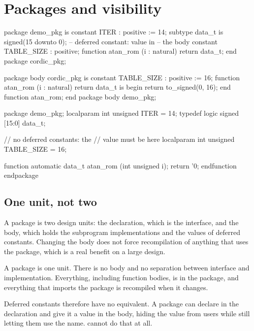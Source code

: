 \section{Packages and visibility}
\label{sec:rosetta:packages}

\begin{rosetta}
\begin{rleft}
package demo_pkg is
  constant ITER : positive := 14;
  subtype data_t is
    signed(15 downto 0);
  -- deferred constant: value in
  -- the body
  constant TABLE_SIZE : positive;
  function atan_rom (i : natural)
    return data_t;
end package cordic_pkg;

package body cordic_pkg is
  constant TABLE_SIZE : positive := 16;
  function atan_rom (i : natural)
    return data_t is
  begin
    return to_signed(0, 16);
  end function atan_rom;
end package body demo_pkg;
\end{rleft}
\begin{rright}
package demo_pkg;
  localparam int unsigned ITER = 14;
  typedef logic signed [15:0] data_t;

  // no deferred constants: the
  // value must be here
  localparam int unsigned
    TABLE_SIZE = 16;

  function automatic data_t
      atan_rom (int unsigned i);
    return '0;
  endfunction
endpackage
\end{rright}
\end{rosetta}


\subsection{One unit, not two}

A \VHDL{} package is two design units: the declaration, which is the interface,
and the body, which holds the subprogram implementations and the values of
deferred constants. Changing the body does not force recompilation of anything
that uses the package, which is a real benefit on a large design.

A \SV{} package is one unit. There is no body and no separation between
interface and implementation. Everything, including function bodies, is in the
package, and everything that imports the package is recompiled when it changes.

Deferred constants therefore have no equivalent. A \VHDL{} package can declare
 in the declaration and give it a value
in the body, hiding the value from users while still letting them use the name.
\SV{} cannot do that at all.

